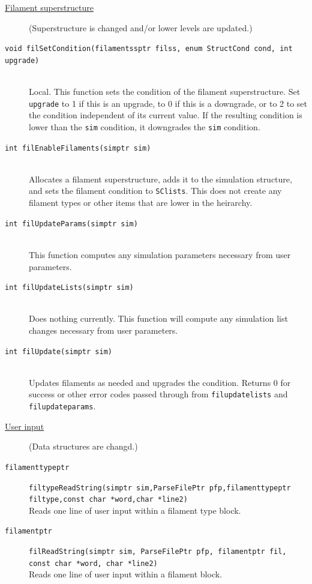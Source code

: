 \documentclass {scrbook}
\newcommand {\ttt} {\texttt}
\begin{document}
\begin{description}
\item[\underline{Filament superstructure}]
(Superstructure is changed and/or lower levels are updated.)

\item[\ttt{void filSetCondition(filamentssptr filss, enum StructCond cond, int upgrade)}]
\hfill \\
Local. This function sets the condition of the filament superstructure. Set \ttt{upgrade} to 1 if this is an upgrade, to 0 if this is a downgrade, or to 2 to set the condition independent of its current value. If the resulting condition is lower than the \ttt{sim} condition, it downgrades the \ttt{sim} condition.

\item[\ttt{int filEnableFilaments(simptr sim)}]
\hfill \\
Allocates a filament superstructure, adds it to the simulation structure, and sets the filament condition to \ttt{SClists}. This does not create any filament types or other items that are lower in the heirarchy.

\item[\ttt{int filUpdateParams(simptr sim)}]
\hfill \\
This function computes any simulation parameters necessary from user parameters.%

\item[\ttt{int filUpdateLists(simptr sim)}]
\hfill \\
Does nothing currently. This function will compute any simulation list changes necessary from user parameters.

\item[\ttt{int filUpdate(simptr sim)}]
\hfill \\
Updates filaments as needed and upgrades the condition. Returns 0 for success or other error codes passed through from \ttt{filupdatelists} and \ttt{filupdateparams}.


\item[\underline{User input}]
(Data structures are changd.)

\item[\ttt{filamenttypeptr}]
\ttt{filtypeReadString(simptr sim,ParseFilePtr pfp,filamenttypeptr filtype,const char *word,char *line2)}
\hfill \\
Reads one line of user input within a filament type block.

\item[\ttt{filamentptr}]
\ttt{filReadString(simptr sim, ParseFilePtr pfp, filamentptr fil, const char *word, char *line2)}
\hfill \\
Reads one line of user input within a filament block.


\end{description}
\end{document}
